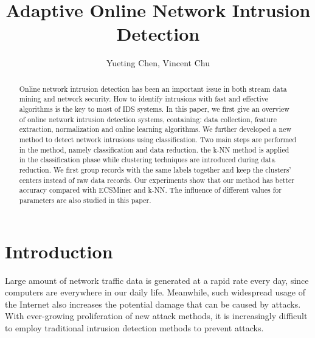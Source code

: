 \documentclass[runningheads]{llncs}
\begin{document}
	
	\title{Adaptive Online Network Intrusion Detection}
	
	\author{Yueting Chen, Vincent Chu}
	
	
	\maketitle
	
	{\tiny }
	\begin{abstract} \label{abstract}
	
		Online network intrusion detection has been an important issue in both stream data mining and network security. How to identify intrusions with fast and effective algorithms is the key to most of IDS systems. In this paper, we first give an overview of online network intrusion detection systems, containing: data collection, feature extraction, normalization and online learning algorithms. We further developed a new method to detect network intrusions using classification. Two main steps are performed in the method, namely classification and data reduction. the k-NN method is applied in the classification phase while clustering techniques are introduced during data reduction. We first group records with the same labels together and keep the clusters' centers instead of raw data records. Our experiments show that our method has better accuracy compared with ECSMiner and k-NN. The influence of different values for parameters are also studied in this paper. 
		
	\end{abstract}
	
	\section{Introduction} \label{introduction}
	
	Large amount of network traffic data is generated at a rapid rate every day, since computers are everywhere in our daily life. Meanwhile, such widespread usage of the Internet also increases the potential damage that can be caused by attacks. With ever-growing proliferation of new attack methods, it is increasingly difficult to employ traditional intrusion detection methods to prevent attacks.
	
\end{document}
